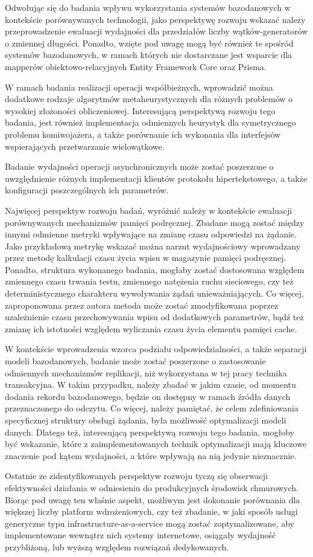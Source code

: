 Odwołując się do badania wpływu wykorzystania systemów bazodanowych w kontekście porównywanych technologii, jako perspektywę rozwoju wskazać należy przeprowadzenie ewaluacji wydajności dla przedziałów liczby wątków-generatorów o zmiennej długości. Ponadto, wzięte pod uwagę mogą być również te spośród systemów bazodanowych, w ramach których nie dostarczane jest wsparcie dla mapperów obiektowo-relacyjnych Entity Framework Core oraz Prisma.

W ramach badania realizacji operacji współbieżnych, wprowadzić można dodatkowe rodzaje algorytmów metaheurystycznych dla różnych problemów o wysokiej złożoności obliczeniowej. Interesującą perspektywą rozwoju tego badania, jest również implementacja odmiennych heurystyk dla symetrycznego problemu komiwojażera, a także porównanie ich wykonania dla interfejsów wspierających przetwarzanie wielowątkowe.

Badanie wydajności operacji asynchronicznych może zostać poszerzone o uwzględnienie różnych implementacji klientów protokołu hipertekstowego, a także konfiguracji poszczególnych ich parametrów.

Najwięcej perspektyw rozwoju badań, wyróżnić należy w kontekście ewaluacji porównywanych mechanizmów pamięci podręcznej. Zbadane mogą zostać między innymi odmienne metryki wpływające na zmianę czasu odpowiedzi na żądanie. Jako przykładową metrykę wskazać można narzut wydajnościowy wprowadzany przez metodę kalkulacji czasu życia wpisu w magazynie pamięci podręcznej. Ponadto, struktura wykonanego badania, mogłaby zostać dostosowana względem zmiennego czasu trwania testu, zmiennego natężenia ruchu sieciowego, czy też deterministycznego charakteru wywoływania żądań unieważniających. Co więcej, zaproponowana przez autora metoda może zostać zmodyfikowana poprzez uzależnienie czasu przechowywania wpisu od dodatkowych parametrów, bądź też zmianę ich istotności względem wyliczania czasu życia elementu pamięci cache.

W kontekście wprowadzenia wzorca podziału odpowiedzialności, a także separacji modeli bazodanowych, badanie może zostać poszerzone o zastosowanie odmiennych mechanizmów replikacji, niż wykorzystana w tej pracy technika transakcyjna. W takim przypadku, należy zbadać w jakim czasie, od momentu dodania rekordu bazodanowego, będzie on dostępny w ramach źródła danych przeznaczonego do odczytu. Co więcej, należy pamiętać, że celem zdefiniowania specyficznej struktury obsługi żądania, była możliwość optymalizacji modeli danych. Dlatego też, interesującą perspektywą rozwoju tego badania, mogłoby być wskazanie, które z zaimplementowanych technik optymalizacji mają kluczowe znaczenie pod kątem wydajności, a które wpływają na nią jedynie nieznacznie.

Ostatnie ze zidentyfikowanych perspektyw rozwoju tyczą się obserwacji efektywności działania w odniesieniu do produkcyjnych środowisk chmurowych. Biorąc pod uwagę ten właśnie aspekt, możliwym jest dokonanie porównania dla większej liczby platform wdrożeniowych, czy też zbadanie, w jaki sposób usługi generyczne typu infrastructure-as-a-service mogą zostać zoptymalizowane, aby implementowane wewnątrz nich systemy internetowe, osiągały wydajność przybliżoną, lub wyższą względem rozwiązań dedykowanych. 

